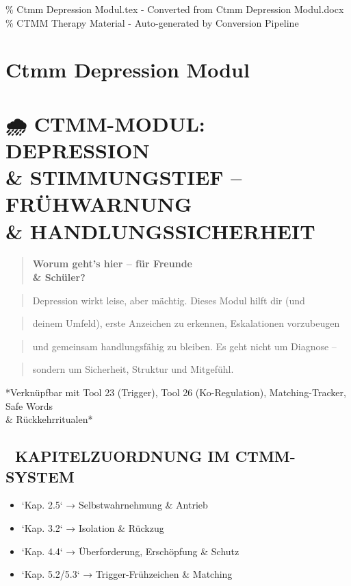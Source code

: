 \% Ctmm Depression Modul.tex - Converted from Ctmm Depression Modul.docx
\% CTMM Therapy Material - Auto-generated by Conversion Pipeline

\section{Ctmm Depression Modul}
\label{sec:ctmm-depression-modul}

\section{🌧️ \textcolor{ctmmBlue}{CTMM}-MODUL: DEPRESSION \\& STIMMUNGSTIEF -- FRÜHWARNUNG \\& HANDLUNGSSICHERHEIT}

\begin{quote}
\textcolor{ctmmPurple}{} \textbf{Worum geht's hier -- für Freunde \\& Schüler?}\
\end{quote}
\begin{quote}
Depression wirkt leise, aber mächtig. Dieses Modul hilft dir (und
\end{quote}
\begin{quote}
deinem Umfeld), erste Anzeichen zu erkennen, Eskalationen vorzubeugen
\end{quote}
\begin{quote}
und gemeinsam handlungsfähig zu bleiben. Es geht nicht um Diagnose --
\end{quote}
\begin{quote}
sondern um Sicherheit, Struktur und Mitgefühl.
\end{quote}

\textcolor{ctmmBlue}{} *Verknüpfbar mit Tool 23 (\textcolor{ctmmRed}{Trigger}), Tool 26 (Ko-Regulation),
Matching-Tracker, Safe Words \\& Rückkehrritualen*

\subsection{📘 KAPITELZUORDNUNG IM \textcolor{ctmmBlue}{CTMM}-SYSTEM}

\begin{itemize}
\item   `Kap. 2.5` → Selbstwahrnehmung \& Antrieb
\item   `Kap. 3.2` → Isolation \& Rückzug
\item   `Kap. 4.4` → Überforderung, Erschöpfung \& Schutz
\item   `Kap. 5.2/5.3` → Trigger-Frühzeichen \& Matching
\end{itemize}

